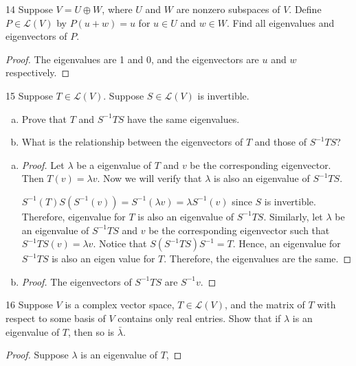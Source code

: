 \documentclass{article}
\newenvironment{problem}[1]{\begin{prob*}{#1}{}}{\end{prob*}}
\begin{document}
\begin{problem}{14}
Suppose $V = U \oplus W$, where $U$ and $W$ are nonzero subspaces of $V$. Define $P \in \mathcal{L}(V)$ by $P(u + w) = u$ for $u \in U$ and $w \in W$. Find all eigenvalues and eigenvectors of $P$.
\end{problem}
\begin{proof}
	The eigenvalues are 1 and 0, and the eigenvectors are $u$ and $w$ respectively.
\end{proof}

\begin{problem}{15}
Suppose $T \in \mathcal{L}(V)$. Suppose $S \in \mathcal{L}(V)$ is invertible.
\begin{enumerate}[(a)]
	\item Prove that $T$ and $S^{-1}TS$ have the same eigenvalues.
	\item What is the relationship between the eigenvectors of $T$ and those of $S^{-1}TS$?
\end{enumerate}
\end{problem}
\begin{enumerate}[(a)]
	\item \begin{proof}
		      Let $\lambda$ be a eigenvalue of $T$ and $v$ be the corresponding eigenvector. Then $T(v) = \lambda v$. Now we will verify that $\lambda$ is also an eigenvalue of $S^{-1}TS$. \par
		      $S^{-1}(T)S(S^{-1}(v)) = S^{-1}(\lambda v) = \lambda S^{-1}(v)$ since $S$ is invertible. Therefore, eigenvalue for $T$ is also an eigenvalue of $S^{-1}TS$. Similarly, let $\lambda$ be an eigenvalue of $S^{-1}TS$ and $v$ be the corresponding eigenvector such that $S^{-1}TS(v) = \lambda v$. Notice that $S(S^{-1}TS)S^{-1} = T$. Hence, an eigenvalue for $S^{-1}TS$ is also an eigen value for $T$. Therefore, the eigenvalues are the same.
	      \end{proof}
	\item
	      \begin{proof}
		      The eigenvectors of $S^{-1}TS$ are $S^{-1}v$.
	      \end{proof}
\end{enumerate}

\begin{problem}{16}
Suppose $V$ is a complex vector space, $T \in \mathcal{L}(V)$, and the matrix of $T$ with respect to some basis of $V$ contains only real entries. Show that if $\lambda$ is an eigenvalue of $T$, then so is $\bar{\lambda}$.
\end{problem}
\begin{proof}
	Suppose $\lambda$ is an eigenvalue of $T$,
\end{proof}
\end{document}
